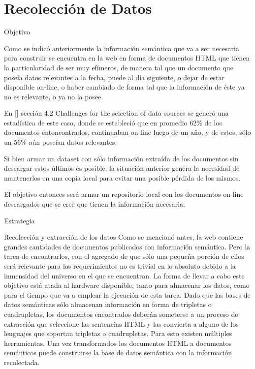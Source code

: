 \chapter{Recolección de Datos}
\label{chapter:recoleccion}

Objetivo 

Como se indicó anteriormente la información semántica que va a ser necesaria para construir se encuentra en la web en forma de documentos 
HTML que tienen la particularidad de ser muy efímeros, de manera tal que un documento que poseía datos relevantes a la fecha,
puede al día siguiente, o dejar de estar disponible on-line, o haber cambiado de forma tal que la información de éste ya no es 
relevante, o ya no la posee. 

En [] sección 4.2 Challenges for the selection of data sources se generó una estadística de este caso, donde se estableció que 
en promedio 62\% de los documentos entoncontrados, continuaban on-line luego de un año, y de estos, sólo un 56\% aún poseían 
datos relevantes. 

Si bien armar un dataset con sólo información extraída de los documentos sin descargar estos últimos es posible, la situación anterior 
genera la necesidad de mantenerlos en una copia local para evitar una posible pérdida de los mismos. 

El objetivo entonces será armar un repositorio local con los documentos on-line descargados que se cree que tienen la información 
necesaria. 

 

Estrategia


Recolección y extracción de los datos
Como se mencionó antes, la web contiene grandes cantidades de documentos publicados con información semántica. Pero la tarea
de encontrarlos, con el agregado de que sólo una pequeña porción de ellos será relevante para los requerimientos no es trivial
en lo absoluto debido a la inmensidad del universo en el que se encuentran. La forma de llevar a cabo este objetivo está 
atada al hardware disponible, tanto para almacenar los datos, como para el tiempo que va a emplear la ejecución de esta 
tarea. 
Dado que las bases de datos semánticas sólo almacenan información en forma de tripletas o cuadrupletas, los documentos encontrados 
deberán someterse a un proceso de extracción que seleccione las sentencias HTML y las convierta a alguno de los lenguajes que soportan  
tripletas o cuadrupletas. Para esto existen múltiples herramientas.
Una vez transformados los documentos HTML a documentos semánticos puede construirse la base de datos semántica con la información 
recolectada.




